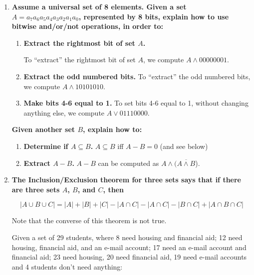 \documentclass[12pt]{amsart}
\begin{document}
\begin{enumerate}
\begin{enumerate}
Reasoning as above, we see that $\oplus$ does not distribute over
intersection.  If an element $x$ is in a set $A$ and is in {\em one}
of $B$ or $C$, {\em but not both}, then $x \in A \oplus (B \cap C)$,
but $x \notin (A \oplus B) \cap (A \oplus C)$.

\end{enumerate}

\medskip

\item {\bf Assume a universal set of 8 elements.  Given a set $A = a_7a_6a_5a_4a_3a_2a_1a_0$, represented by 8 bits, explain how to use bitwise and/or/not operations, in order to:}
\begin{enumerate}
\item {\bf Extract the rightmost bit of set $A$.}

To ``extract'' the rightmost bit of set $A$, we compute $A \land 00000001$.

\item {\bf Extract the odd numbered bits.}
To ``extract'' the odd numbered bits, we compute $A \land 10101010$.

\item {\bf Make bits 4-6 equal to 1.}
To set bits 4-6 equal to 1, without changing anything else, we compute $A \lor 01110000$.
\end{enumerate}
{\bf Given another set $B$, explain how to:}
\begin{enumerate}
\item {\bf Determine if $A \subseteq B$.}
$A \subseteq B$ iff $A - B = 0$ (and see below)

\item {\bf Extract $A - B$.}
$A - B$ can be computed as $A \land (\overline{A \land B}$).
\end{enumerate}

\medskip

\item {\bf The Inclusion/Exclusion theorem for three sets says that if there are three sets $A$, $B$, and $C$, then

$$
|A \cup B \cup C| = |A| + |B| + |C| - |A \cap C| - |A \cap C| - |B \cap C| + |A \cap B \cap C|
$$

Note that the converse of this theorem is not true.

Given a set of 29 students, where 8 need housing and financial aid; 12
need housing, financial aid, and an e-mail account; 17 need an e-mail
account and financial aid; 23 need housing, 20 need financial aid, 19
need e-mail accounts and 4 students don't need anything:
}


\end{enumerate}
\end{document}
